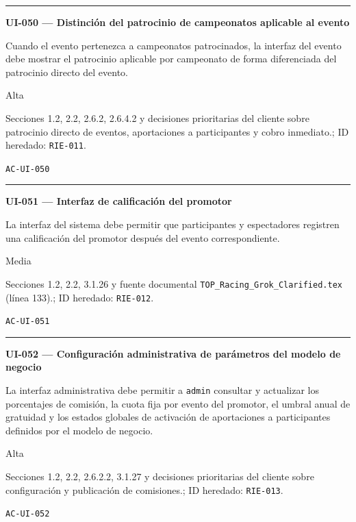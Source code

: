 \documentclass[10pt,letterpaper]{article}
\begin{document}
\vspace{0.25em}\hrule\vspace{0.65em}
\noindent\textbf{UI-050 --- Distinción del patrocinio de campeonatos aplicable al evento}\par
\begin{description}[style=nextline,leftmargin=3.15cm,labelwidth=2.8cm,font=\normalfont\bfseries]
\item[Obligación] Cuando el evento pertenezca a campeonatos patrocinados, la interfaz del evento debe mostrar el patrocinio aplicable por campeonato de forma diferenciada del patrocinio directo del evento.
\item[Prioridad] Alta
\item[Procedencia] Secciones 1.2, 2.2, 2.6.2, 2.6.4.2 y decisiones prioritarias del cliente sobre patrocinio directo de eventos, aportaciones a participantes y cobro inmediato.; ID heredado: \texttt{RIE-011}.
\item[Verificación] \texttt{AC-UI-050}
\end{description}
\vspace{0.25em}\hrule\vspace{0.65em}
\noindent\textbf{UI-051 --- Interfaz de calificación del promotor}\par
\begin{description}[style=nextline,leftmargin=3.15cm,labelwidth=2.8cm,font=\normalfont\bfseries]
\item[Obligación] La interfaz del sistema debe permitir que participantes y espectadores registren una calificación del promotor después del evento correspondiente.
\item[Prioridad] Media
\item[Procedencia] Secciones 1.2, 2.2, 3.1.26 y fuente documental \texttt{TOP\_Racing\_Grok\_Clarified.tex} (línea 133).; ID heredado: \texttt{RIE-012}.
\item[Verificación] \texttt{AC-UI-051}
\end{description}
\vspace{0.25em}\hrule\vspace{0.65em}
\noindent\textbf{UI-052 --- Configuración administrativa de parámetros del modelo de negocio}\par
\begin{description}[style=nextline,leftmargin=3.15cm,labelwidth=2.8cm,font=\normalfont\bfseries]
\item[Obligación] La interfaz administrativa debe permitir a \texttt{admin} consultar y actualizar los porcentajes de comisión, la cuota fija por evento del promotor, el umbral anual de gratuidad y los estados globales de activación de aportaciones a participantes definidos por el modelo de negocio.
\item[Prioridad] Alta
\item[Procedencia] Secciones 1.2, 2.2, 2.6.2.2, 3.1.27 y decisiones prioritarias del cliente sobre configuración y publicación de comisiones.; ID heredado: \texttt{RIE-013}.
\item[Verificación] \texttt{AC-UI-052}
\end{description}
\end{document}
